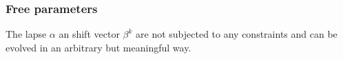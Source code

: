 \documentclass[
10pt, %
a4paper, %
oneside, %
headinclude,footinclude, %
BCOR5mm, %
]{scrartcl}
\newcommand{\sA}{\mathsmaller A}
\newcommand{\sB}{\mathsmaller B}
\newcommand{\sC}{\mathsmaller C}
\newcommand{\pd}[1]{\partial_{#1}}
\newcommand{\tetrsymbol}{h}
\newcommand{\itetrsymbol}{\eta}
\newcommand{\itetr}[2]{\itetrsymbol^{#1}_{\phantom{#1}#2}}
\newcommand{\tetr}[2]{\tetrsymbol^{#1}_{\phantom{#1}#2}}
\newcommand{\ET}[2]{E^{#1}_{\phantom{#1}#2}}	%
\newcommand{\Dm}[2]{D_{\phantom{#2}#1}^{#2}}	%
\newcommand{\aD}[2]{\mathcal{D}_{\phantom{#2}#1}^{#2}}	%
\newcommand{\Dfin}[2]{\mathtt{D}_{\phantom{#2}#1}^{#2}}	%
\newcommand{\Ufin}{\mathtt{U}}
\newcommand{\BT}[2]{B^{#1#2}}	%
\newcommand{\Bm}[2]{B^{#1#2}}	%
\newcommand{\aB}[2]{\mathcal{B}^{#1#2}}	%
\newcommand{\Bfin}[2]{\mathtt{B}^{#1#2}}	%
\newcommand{\Lag}{\Lambda}	%
\newcommand{\Laghodge}{L}%
\newcommand{\LagBE}{\mathcal{L}}%
\newcommand{\Um}{U}%
\newcommand{\aU}{\mathcal{U}}%
\newcommand{\LCsymb}{\bm{\in}}    %
\newcommand{\HDT}[1]{\accentset{\star}{T}^{#1}}
\newcommand{\shift}[1]{\beta^{#1}}
\begin{document}
\subsubsection{Free parameters}

The lapse $\alpha$  an shift vector $\shift{k}$ are not subjected to any constraints and can be 
evolved in an arbitrary but meaningful way. 


%
\end{document}
